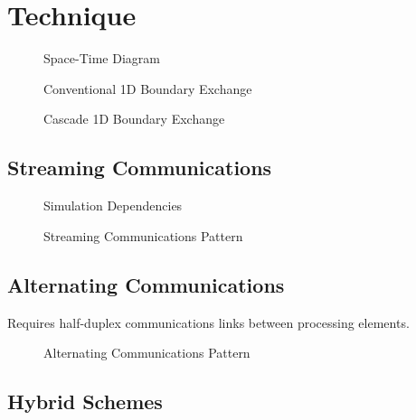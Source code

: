 \section{Technique}

\begin{figure}
  \centering
  
  \caption{Space-Time Diagram}
  \label{fig:lightcone}
\end{figure}


\begin{figure}
  \centering
  
  \caption{Conventional 1D Boundary Exchange}
  \label{fig:exch1d}
\end{figure}

\begin{figure}
  \centering
  
  \caption{Cascade 1D Boundary Exchange}
  \label{fig:casc1d}
\end{figure}





\subsection{Streaming Communications}
\begin{figure}
  \centering
  
  \caption{Simulation Dependencies}
  \label{fig:simcone}
\end{figure}

\begin{figure}
  \centering
  
  \caption{Streaming Communications Pattern}
  \label{fig:streamingcomms}
\end{figure}


\subsection{Alternating Communications}

Requires half-duplex communications links between processing elements.
\begin{figure}
  \centering
  
  \caption{Alternating Communications Pattern}
  \label{fig:alternatingcomms}
\end{figure}


\subsection{Hybrid Schemes}

